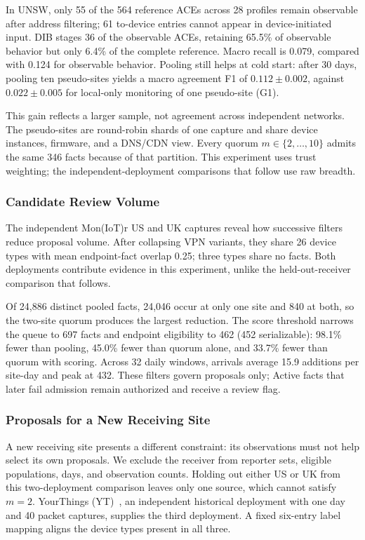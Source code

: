 \documentclass[journal]{IEEEtran}
\theoremstyle{definition}
\begin{document}
In UNSW, only 55 of the 564 reference ACEs across 28 profiles remain observable after address filtering; 61 to-device entries cannot appear in device-initiated input. DIB stages 36 of the observable ACEs, retaining 65.5\% of observable behavior but only 6.4\% of the complete reference. Macro recall is 0.079, compared with 0.124 for observable behavior. Pooling still helps at cold start: after 30 days, pooling ten pseudo-sites yields a macro agreement F1 of $0.112\pm0.002$, against $0.022\pm0.005$ for local-only monitoring of one pseudo-site (G1).

This gain reflects a larger sample, not agreement across independent networks. The pseudo-sites are round-robin shards of one capture and share device instances, firmware, and a DNS/CDN view. Every quorum $m\in\{2,\ldots,10\}$ admits the same 346 facts because of that partition. This experiment uses trust weighting; the independent-deployment comparisons that follow use raw breadth.

\subsubsection{Candidate Review Volume}
\label{sec:workload-results}
The independent Mon(IoT)r US and UK captures reveal how successive filters reduce proposal volume. After collapsing VPN variants, they share 26 device types with mean endpoint-fact overlap 0.25; three types share no facts. Both deployments contribute evidence in this experiment, unlike the held-out-receiver comparison that follows.

Of 24,886 distinct pooled facts, 24,046 occur at only one site and 840 at both, so the two-site quorum produces the largest reduction. The score threshold narrows the queue to 697 facts and endpoint eligibility to 462 (452 serializable): 98.1\% fewer than pooling, 45.0\% fewer than quorum alone, and 33.7\% fewer than quorum with scoring. Across 32 daily windows, arrivals average 15.9 additions per site-day and peak at 432. These filters govern proposals only; Active facts that later fail admission remain authorized and receive a review flag.

\subsubsection{Proposals for a New Receiving Site}
\label{sec:loo-results}

A new receiving site presents a different constraint: its observations must not help select its own proposals. We exclude the receiver from reporter sets, eligible populations, days, and observation counts. Holding out either US or UK from this two-deployment comparison leaves only one source, which cannot satisfy $m=2$. YourThings (YT)~\cite{alrawi2019yourthings}, an independent historical deployment with one day and 40 packet captures, supplies the third deployment. A fixed six-entry label mapping aligns the device types present in all three.
\end{document}
